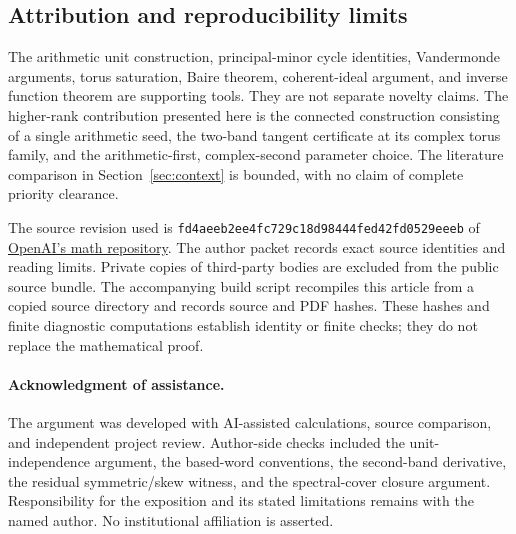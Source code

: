 \subsection{Attribution and reproducibility limits}
The arithmetic unit construction, principal-minor cycle identities,
Vandermonde arguments, torus saturation, Baire theorem, coherent-ideal
argument, and inverse function theorem are supporting tools. They are not
separate novelty claims. The higher-rank contribution presented here is
the connected construction consisting of a single arithmetic seed,
the two-band tangent certificate at its complex torus family, and the
arithmetic-first, complex-second parameter choice. The literature
comparison in Section~\ref{sec:context} is bounded, with no claim of
complete priority clearance.

The source revision used is
\texttt{fd4aeeb2ee4fc729c18d98444fed42fd0529eeeb} of
\href{https://github.com/openai/math}{OpenAI's math repository}.
The author packet records exact source identities and reading limits.
Private copies of third-party bodies are excluded from the public source
bundle. The accompanying build script recompiles this article from a
copied source directory and records source and PDF hashes. These hashes
and finite diagnostic computations establish identity or finite checks;
they do not replace the mathematical proof.

\paragraph{Acknowledgment of assistance.}
The argument was developed with AI-assisted calculations, source
comparison, and independent project review. Author-side checks included
the unit-independence argument, the based-word conventions, the second-band
derivative, the residual symmetric/skew witness, and the spectral-cover
closure argument. Responsibility for the exposition and its stated
limitations remains with the named author. No institutional affiliation
is asserted.
